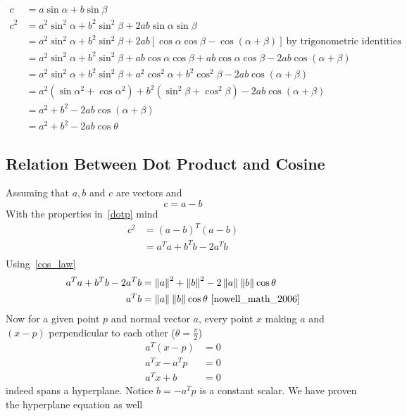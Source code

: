 \documentclass{article}
\newcommand{\norm}[2][]{\left\lVert#2\right\rVert_{#1}}
\numberwithin{equation}{subsection}
\begin{document}
\begin{align}
    c &= a\sin\alpha + b\sin \beta\\
    c^2 &= a^2\sin^2 \alpha + b^2\sin^2 \beta + 2ab\sin\alpha\sin \beta\\
     &= a^2\sin^2 \alpha + b^2\sin^2 \beta + 2ab[\cos \alpha\cos\beta - \cos(\alpha +\beta)]\ \text{by trigonometric identities}\\
     &= a^2\sin^2 \alpha + b^2\sin^2 \beta + ab\cos \alpha\cos\beta + ab\cos \alpha\cos\beta - 2ab\cos(\alpha +\beta)\\
     &= a^2\sin^2 \alpha + b^2\sin^2 \beta + a^2\cos^2 \alpha + b^2\cos^2 \beta - 2ab\cos(\alpha +\beta)\\
     &= a^2(\sin\alpha^2 + \cos \alpha^2) + b^2(\sin^2 \beta + \cos^2 \beta) - 2ab\cos(\alpha +\beta)\\
     &= a^2 + b^2 - 2ab\cos(\alpha +\beta)\\
     &= a^2 + b^2 - 2ab\cos \theta \label{cos_law}
\end{align}
\subsection{Relation Between Dot Product and Cosine} 
Assuming that $a, b$ and $c$ are vectors and
\begin{equation}
    c = a-b
\end{equation} 
With the properties in~\ref{dotp} mind
\begin{align}
    c^2 &= (a-b)^T(a-b)\\
    &= a^Ta +b^Tb - 2a^Tb\\
\end{align}
Using~\ref{cos_law}
\begin{align}
    a^Ta +b^Tb - 2a^Tb &= \norm{a}^2 + \norm{b}^2 - 2\norm{a}\norm{b}\cos \theta\\
    a^Tb &= \norm{a}\norm{b}\cos \theta~\cite{nowell_math_2006}
\end{align}
Now for a given point $p$ and normal vector $a$, every point $x$ making $a$ and $(x-p)$ perpendicular to each other ($\theta = \frac{\pi}{2}$) 
\begin{align}
    a^T(x-p) &= 0\\
    a^Tx-a^Tp &= 0\\
    a^Tx+b &= 0
\end{align}
indeed spans a hyperplane. Notice $b = -a^Tp$ is a constant scalar. We have proven the hyperplane equation as well
\end{document}
